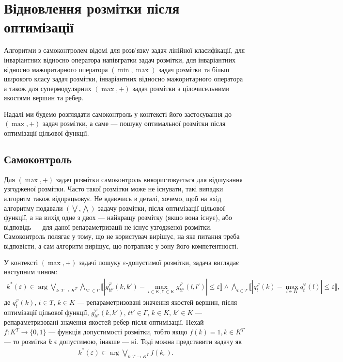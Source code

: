 \section{Відновлення розмітки після оптимізації}

Алгоритми з самоконтролем відомі для розв'язку задач лінійної
класифікації, для інваріантних відносно оператора напівгратки задач розмітки,
для інваріантних відносно мажоритарного оператора $(\min, \max)$ задач розмітки
та більш широкого класу задач розмітки, інваріантних відносно мажоритарного
оператора а також для супермодулярних $(\max,+)$
задач розмітки з цілочисельними якостями вершин та ребер.

Надалі ми будемо розглядати самоконтроль у контексті його застосування до $(\max,+)$
задач розмітки, а саме --- пошуку оптимальної розмітки після оптимізації цільової функції.

\subsection{Самоконтроль}

Для $(\max,+)$ задач розмітки самоконтроль використовується для відшукання узгодженої 
розмітки. Часто такої розмітки може не існувати, такі випадки алгоритм також відпрацьовує.
Не вдаючись в деталі, хочемо, щоб на вхід алгоритму подавали $(\bigvee, \bigwedge)$ задачу розмітки, після
оптимізації цільової функції, а на вихід одне з двох --- найкращу розмітку (якщо вона існує), або
відповідь --- для даної репараметризації не існує узгодженої розмітки.
Самоконтроль полягає у тому, що не користувач вирішує, на яке питання треба відповісти,
а сам алгоритм вирішує, що потрапляє у зону його компетентності.

У контексті $(\max,+)$ задачі пошуку $\varepsilon$-допустимої розмітки, 
задача виглядає наступним чином:
\begin{equation*}
    \begin{aligned}
    k^*(\varepsilon)\in\arg\bigvee_{k:T\rightarrow K^T}\bigwedge_{tt'\in\Gamma}
    \llbracket |g^\varphi_{tt'}(k,k')-\max\limits_{l\in K, l'\in K}g^{\varphi}_{tt'}(l,l')|\leq\varepsilon\rrbracket\wedge
    \bigwedge_{t\in T}\llbracket|q^{\varphi}_t(k) - \max\limits_{l\in K}q^{\varphi}_t(l)|\leq \varepsilon\rrbracket,
\end{aligned}
\end{equation*}
де $q^{\varphi}_t(k)$, $t\in T$, $k\in K$ --- репараметризовані значення якостей вершин, 
після оптимізації цільової функції, $g^\varphi_{tt'}(k,k')$, $tt'\in\Gamma$, $k\in K$, 
$k'\in K$ --- репараметризовані значення якостей ребер після оптимізації.
Нехай $f:K^T\rightarrow \{0,1\}$ --- функція допустимості розмітки, тобто якщо
$f(k)=1, k\in K^T$ --- то розмітка $k$ є допустимою, інакше --- ні. 
Тоді можна представити задачу як
\begin{equation*}
    \begin{aligned}
    k^*(\varepsilon)\in\arg\bigvee_{k:T\rightarrow K^T}
    f(k_\varepsilon).
\end{aligned}
\end{equation*}

